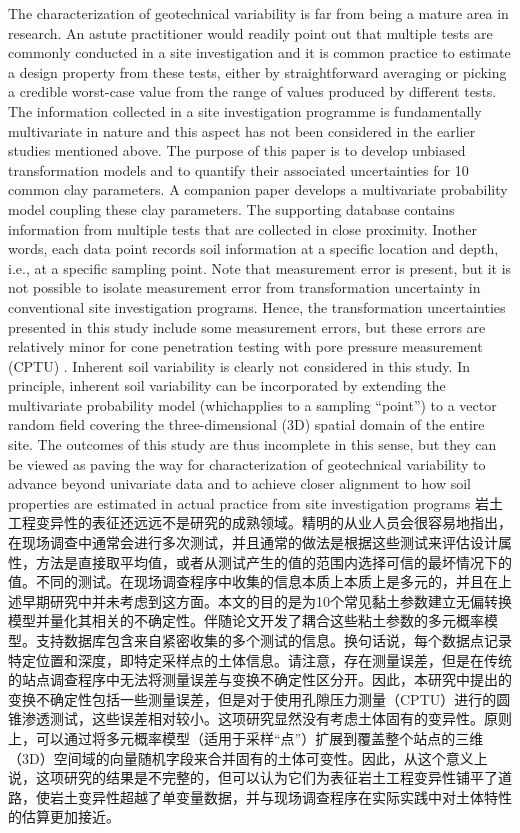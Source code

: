 \begin{paracol}{2}
\begin{Parallel}{0.60\textwidth}{}
{        The characterization of geotechnical variability is far from being a mature area in research. An astute practitioner would readily point out that multiple tests are commonly conducted in a site investigation and it is common practice to estimate a design property from these tests, either by straightforward averaging or picking a credible worst-case value from the range of values produced by different tests. The information collected in a site investigation programme is fundamentally multivariate in nature and this aspect has not been considered in the earlier studies mentioned above. The purpose of this paper is to develop unbiased transformation models and to quantify their associated uncertainties for 10 common clay parameters. A companion paper \citep{Ching2014686} develops a multivariate probability model coupling these clay parameters. The supporting database contains information from multiple tests that are collected in close proximity. Inother words, each data point records soil information at a specific location and depth, i.e., at a specific sampling point. Note that measurement error is present, but it is not possible to isolate measurement error from transformation uncertainty in conventional site investigation programs. Hence, the transformation uncertainties presented in this study include some measurement errors, but these errors are relatively minor for cone penetration testing with pore pressure measurement (CPTU) \citep{Phoon1999612}. Inherent soil variability is clearly not considered in this study. In principle, inherent soil variability can be incorporated by extending the multivariate probability model (whichapplies to a sampling “point”) to a vector random field covering the three-dimensional (3D) spatial domain of the entire site. The outcomes of this study are thus incomplete in this sense, but they can be viewed as paving the way for characterization of geotechnical variability to advance beyond univariate data and to achieve closer alignment to how soil properties are estimated in actual practice from site investigation programs
    }
    \ParallelRText
    {
        岩土工程变异性的表征还远远不是研究的成熟领域。精明的从业人员会很容易地指出，在现场调查中通常会进行多次测试，并且通常的做法是根据这些测试来评估设计属性，方法是直接取平均值，或者从测试产生的值的范围内选择可信的最坏情况下的值。不同的测试。在现场调查程序中收集的信息本质上本质上是多元的，并且在上述早期研究中并未考虑到这方面。本文的目的是为10个常见黏土参数建立无偏转换模型并量化其相关的不确定性。伴随论文\citep{Ching2014686}开发了耦合这些粘土参数的多元概率模型。支持数据库包含来自紧密收集的多个测试的信息。换句话说，每个数据点记录特定位置和深度，即特定采样点的土体信息。请注意，存在测量误差，但是在传统的站点调查程序中无法将测量误差与变换不确定性区分开。因此，本研究中提出的变换不确定性包括一些测量误差，但是对于使用孔隙压力测量（CPTU）进行的圆锥渗透测试，这些误差相对较小\citep{Phoon1999612}。这项研究显然没有考虑土体固有的变异性。原则上，可以通过将多元概率模型（适用于采样“点”）扩展到覆盖整个站点的三维（3D）空间域的向量随机字段来合并固有的土体可变性。因此，从这个意义上说，这项研究的结果是不完整的，但可以认为它们为表征岩土工程变异性铺平了道路，使岩土变异性超越了单变量数据，并与现场调查程序在实际实践中对土体特性的估算更加接近。
}
\end{Parallel}
\end{paracol}
